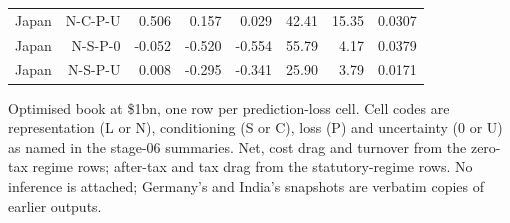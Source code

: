 \begin{table}[t]
\begin{tabular}{lrrrrrrr}
Japan & N-C-P-U & 0.506 & 0.157 & 0.029 & 42.41 & 15.35 & 0.0307 \\
Japan & N-S-P-0 & -0.052 & -0.520 & -0.554 & 55.79 & 4.17 & 0.0379 \\
Japan & N-S-P-U & 0.008 & -0.295 & -0.341 & 25.90 & 3.79 & 0.0171 \\
\bottomrule
\end{tabular}
\par\vspace{2pt}
\parbox{\textwidth}{\footnotesize Optimised book at \$1bn, one row per prediction-loss cell. Cell codes are representation (L or N), conditioning (S or C), loss (P) and uncertainty (0 or U) as named in the stage-06 summaries. Net, cost drag and turnover from the zero-tax regime rows; after-tax and tax drag from the statutory-regime rows. No inference is attached; Germany's and India's snapshots are verbatim copies of earlier outputs.}
\end{table}
